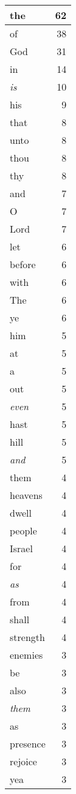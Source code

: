 \begin{center}
\begin{longtable}{l|r}
\hline \hline
\endlastfoot
the & 62 \\ \hline
of & 38 \\ \hline
God & 31 \\ \hline
in & 14 \\ \hline
\emph{is} & 10 \\ \hline
his & 9 \\ \hline
that & 8 \\ \hline
unto & 8 \\ \hline
thou & 8 \\ \hline
thy & 8 \\ \hline
and & 7 \\ \hline
O & 7 \\ \hline
Lord & 7 \\ \hline
let & 6 \\ \hline
before & 6 \\ \hline
with & 6 \\ \hline
The & 6 \\ \hline
ye & 6 \\ \hline
him & 5 \\ \hline
at & 5 \\ \hline
a & 5 \\ \hline
out & 5 \\ \hline
\emph{even} & 5 \\ \hline
hast & 5 \\ \hline
hill & 5 \\ \hline
\emph{and} & 5 \\ \hline
them & 4 \\ \hline
heavens & 4 \\ \hline
dwell & 4 \\ \hline
people & 4 \\ \hline
Israel & 4 \\ \hline
for & 4 \\ \hline
\emph{as} & 4 \\ \hline
from & 4 \\ \hline
shall & 4 \\ \hline
strength & 4 \\ \hline
enemies & 3 \\ \hline
be & 3 \\ \hline
also & 3 \\ \hline
\emph{them} & 3 \\ \hline
as & 3 \\ \hline
presence & 3 \\ \hline
rejoice & 3 \\ \hline
yea & 3 \\ \hline

\end{longtable}
\end{center}

